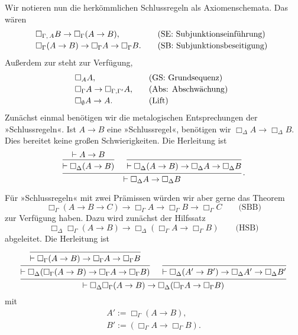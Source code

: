\documentclass[9pt,fleqn,aspectratio=169]{beamer}
\newcommand{\lnec}{\Box}
\begin{document}
\begin{frame}
Wir notieren nun die herkömmlichen Schlussregeln als Axiomenschemata. Das wären
\[\begin{array}{@{}l@{\qquad}l}
\lnec_{\Gamma,\,A} B \to \lnec_\Gamma (A\to B), & \text{(SE: Subjunktionseinführung)}\\[2pt]
\lnec_\Gamma(A\to B) \to \lnec_\Gamma A\to \lnec_\Gamma B. & \text{(SB: Subjunktionsbeseitigung)}
\end{array}\]\pause
Außerdem zur steht zur Verfügung,
\[\begin{array}{@{}l@{\qquad}l}
\lnec_A A, & \text{(GS: Grundsequenz)}\\[2pt]
\lnec_{\Gamma} A\to\lnec_{\Gamma,\Gamma'} A, & \text{(Abs: Abschwächung)}\\[2pt]
\lnec_\emptyset A\to A. & \text{(Lift)}
\end{array}\]\pause
Zunächst einmal benötigen wir die metalogischen Entsprechungen der
»Schlussregeln«. Ist $A\to B$ eine »Schlussregel«, benötigen wir
$\lnec_\Delta A\to\lnec_\Delta B$. Dies bereitet keine großen
Schwierigkeiten. Die Herleitung ist\pause{}
\[\begin{prooftree}
\hypo{\vdash A\to B}
\infer1{\vdash\lnec_\Delta (A\to B)}
\infer0{\vdash\lnec_\Delta (A\to B)\to\lnec_\Delta A\to\lnec_\Delta B}
\infer2[\!\!.]{\vdash\lnec_\Delta A\to\lnec_\Delta B}
\end{prooftree}\]
\end{frame}

\begin{frame}
Für »Schlussregeln« mit zwei Prämissen würden wir aber gerne das Theorem
\[\lnec_\Gamma (A\to B\to C)\to\lnec_\Gamma A\to\lnec_\Gamma B\to\lnec_\Gamma C
\qquad\text{(SBB)}\]
zur Verfügung haben.\pause{} Dazu wird zunächst der Hilfssatz
\[\lnec_\Delta \lnec_\Gamma (A\to B) \to \lnec_\Delta (\lnec_\Gamma A\to \lnec_\Gamma B)
\qquad\text{(HSB)}\]
abgeleitet. Die Herleitung ist\pause{}
\[\begin{prooftree}
    \infer0{\vdash\lnec_\Gamma (A\to B)\to \lnec_\Gamma A\to \lnec_\Gamma B}
  \infer1{\vdash\lnec_\Delta (\lnec_\Gamma (A\to B)\to \lnec_\Gamma A\to \lnec_\Gamma B)}
  \infer0{\vdash\lnec_\Delta (A'\to B')\to \lnec_\Delta A'\to \lnec_\Delta B'}
\infer2{\vdash\lnec_\Delta \lnec_\Gamma (A\to B) \to \lnec_\Delta (\lnec_\Gamma A\to \lnec_\Gamma B)}
\end{prooftree}\]
mit
\begin{gather*}
A' := \lnec_\Gamma (A\to B),\\
B' := (\lnec_\Gamma A\to \lnec_\Gamma B).
\end{gather*}
\end{frame}
\end{document}
